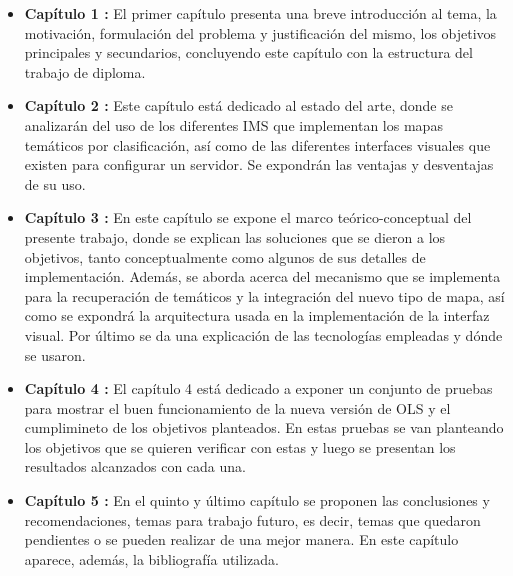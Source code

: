 \begin{itemize}
\item \textbf {Cap\'itulo 1 :} \qquad El primer cap\'itulo presenta una breve introducci\'on al tema, la motivaci\'on, formulaci\'on del problema y justificaci\'on del mismo, los objetivos principales y secundarios, concluyendo este cap\'itulo con la estructura del trabajo de diploma.
\item \textbf {Cap\'itulo 2 :} \qquad Este cap\'itulo est\'a dedicado al estado del arte, donde se analizar\'an del uso de los diferentes IMS que implementan los mapas tem\'aticos por clasificaci\'on, as\'i como de las diferentes interfaces visuales que existen para configurar un servidor. Se expondr\'an las ventajas y desventajas de su uso.
\item \textbf {Cap\'itulo 3 :} \qquad En este cap\'itulo se expone el marco te\'orico-conceptual del presente trabajo, donde se explican las soluciones que se dieron a los objetivos, tanto conceptualmente como algunos de sus detalles de implementaci\'on. Adem\'as, se aborda acerca del mecanismo que se implementa para la recuperaci\'on de tem\'aticos y la integraci\'on del nuevo tipo de mapa, as\'i como se expondr\'a la arquitectura usada en la implementaci\'on de la interfaz visual. Por \'ultimo se da una explicaci\'on de las tecnolog\'ias empleadas y d\'onde se usaron.
\item \textbf {Cap\'itulo 4 :} \qquad El cap\'itulo 4 est\'a dedicado a exponer un conjunto de pruebas para mostrar el buen funcionamiento de la nueva versi\'on de OLS y el cumplimineto de los objetivos planteados. En estas pruebas se van planteando los objetivos que se quieren verificar con estas y luego se presentan los resultados alcanzados con cada una.
\item \textbf {Cap\'itulo 5 :} \qquad En el quinto y \'ultimo cap\'itulo se proponen las conclusiones y recomendaciones, temas para trabajo futuro, es decir, temas que quedaron pendientes o se pueden realizar de una mejor manera. En este cap\'itulo aparece, adem\'as, la bibliograf\'ia utilizada.
\end{itemize}


